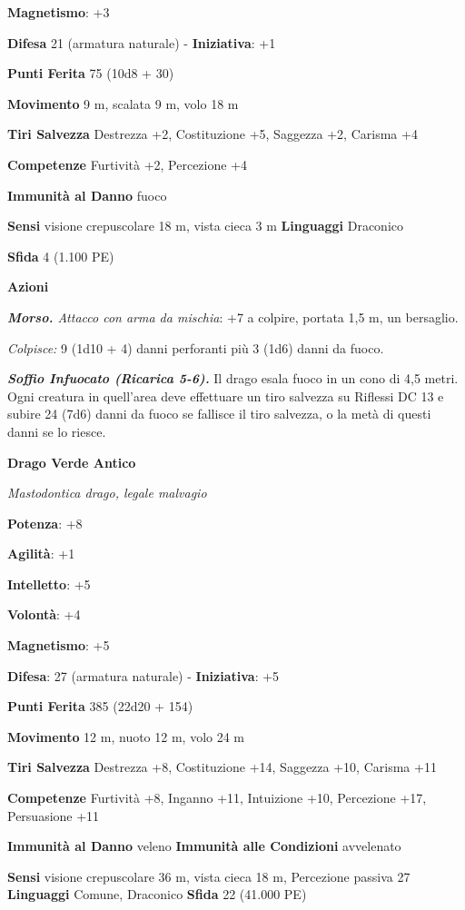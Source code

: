 \begin{multicols}{2}
\textbf{Magnetismo}: +3

\textbf{Difesa} 21 (armatura naturale) - \textbf{Iniziativa}: +1

\textbf{Punti Ferita} 75 (10d8 + 30)

\textbf{Movimento} 9 m, scalata 9 m, volo 18 m

\textbf{Tiri Salvezza} Destrezza +2, Costituzione +5, Saggezza +2,
Carisma +4

\textbf{Competenze} Furtività +2, Percezione +4

\textbf{Immunità al Danno} fuoco

\textbf{Sensi} visione crepuscolare 18 m, vista cieca 3 m
\textbf{Linguaggi} Draconico

\textbf{Sfida} 4 (1.100 PE)

\textbf{Azioni}

\emph{\textbf{Morso.} Attacco con arma da mischia}: +7 a colpire,
portata 1,5 m, un bersaglio.

\emph{Colpisce:} 9 (1d10 + 4) danni perforanti più 3 (1d6) danni da
fuoco.

\emph{\textbf{Soffio Infuocato (Ricarica 5-6).}} Il drago esala fuoco in
un cono di 4,5 metri. Ogni creatura in quell'area deve effettuare un
tiro salvezza su Riflessi DC 13 e subire 24 (7d6) danni da fuoco se
fallisce il tiro salvezza, o la metà di questi danni se lo riesce.

\textbf{Drago Verde Antico}

\emph{Mastodontica drago, legale malvagio}

\textbf{Potenza}: +8

\textbf{Agilità}: +1

\textbf{Intelletto}: +5

\textbf{Volontà}: +4

\textbf{Magnetismo}: +5

\textbf{Difesa}: 27 (armatura naturale) - \textbf{Iniziativa}: +5

\textbf{Punti Ferita} 385 (22d20 + 154)

\textbf{Movimento} 12 m, nuoto 12 m, volo 24 m

\textbf{Tiri Salvezza} Destrezza +8, Costituzione +14, Saggezza +10,
Carisma +11

\textbf{Competenze} Furtività +8, Inganno +11, Intuizione +10, Percezione
+17, Persuasione +11

\textbf{Immunità al Danno} veleno \textbf{Immunità alle Condizioni}
avvelenato

\textbf{Sensi} visione crepuscolare 36 m, vista cieca 18 m, Percezione passiva
27 \textbf{Linguaggi} Comune, Draconico \textbf{Sfida} 22 (41.000 PE)


\end{multicols}
